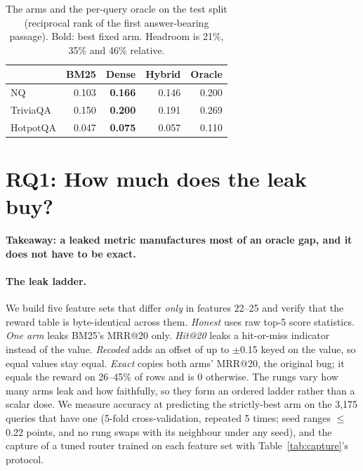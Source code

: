 \documentclass{article}
\begin{document}
\begin{table}[t]
\centering
\small
\caption{The arms and the per-query oracle on the test split (reciprocal rank of the first
answer-bearing passage). Bold: best fixed arm. Headroom is 21\%, 35\% and 46\% relative.}
\label{tab:arms}
\begin{tabular}{lrrrr}
\toprule
& BM25 & Dense & Hybrid & Oracle \\
\midrule
NQ       & 0.103 & \textbf{0.166} & 0.146 & 0.200 \\
TriviaQA & 0.150 & \textbf{0.200} & 0.191 & 0.269 \\
HotpotQA & 0.047 & \textbf{0.075} & 0.057 & 0.110 \\
\bottomrule
\end{tabular}
\end{table}

\section{RQ1: How much does the leak buy?}
\label{sec:doseresponse}

\textbf{Takeaway: a leaked metric manufactures most of an oracle gap, and it does not have to be
exact.}

\paragraph{The leak ladder.} We build five feature sets that differ \emph{only} in features
22--25 and verify that the reward table is byte-identical across them. \emph{Honest} uses raw
top-5 score statistics. \emph{One arm} leaks BM25's MRR@20 only. \emph{Hit@20} leaks a hit-or-miss
indicator instead of the value. \emph{Recoded} adds an offset of up to $\pm$0.15 keyed on the
value, so equal values stay equal. \emph{Exact} copies both arms' MRR@20, the original bug; it equals the reward on
26--45\% of rows and is 0 otherwise. The rungs vary how many arms leak and how faithfully, so they
form an ordered ladder rather than a scalar dose. We measure accuracy at predicting the
strictly-best arm on the 3{,}175 queries that have one (5-fold cross-validation, repeated 5 times;
seed ranges $\le$0.22 points, and no rung swaps with its neighbour under any seed), and the capture
of a tuned router trained on each feature set with Table~\ref{tab:capture}'s protocol.
\end{document}
